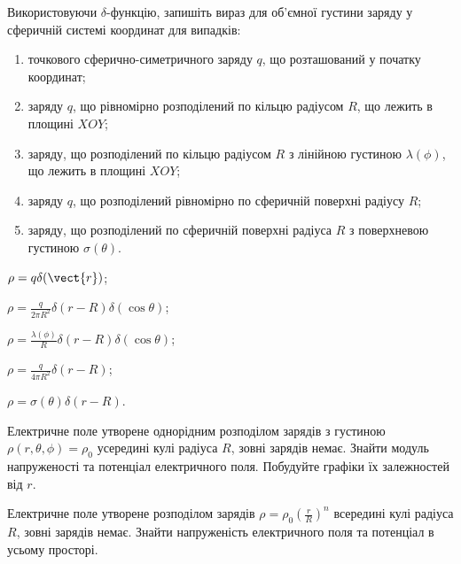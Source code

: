 \begin{problem}
Використовуючи $\delta$-функцію, запишіть вираз для об'ємної густини заряду у сферичній системі координат  для випадків:
\begin{enumerate}[label=\alph*)]
	\item точкового сферично-симетричного заряду $q$, що розташований у початку координат;
	\item заряду $q$, що рівномірно розподілений по кільцю радіусом $R$, що лежить в площині $XOY$;
	\item заряду, що розподілений по кільцю радіусом $R$ з лінійною густиною $\lambda(\phi)$, що лежить в площині $XOY$;
	\item заряду $q$, що розподілений рівномірно по сферичній  поверхні радіусу $R$;
	\item заряду, що розподілений по сферичній поверхні радіуса $R$ з поверхневою густиною $\sigma (\theta)$.
\end{enumerate}
\begin{solution}
	\begin{enumerate*}[label=\alph*)]
		\item $\rho = q\delta(\vect{r})$;
		\item $\rho = \frac{q}{2\pi R^2}\delta(r - R)\delta(\cos\theta)$;
		\item $\rho = \frac{\lambda(\phi)}{R}\delta(r - R)\delta(\cos\theta)$;
		\item $\rho = \frac{q}{4\pi R^2}\delta (r - R)$;
		\item $\rho = \sigma (\theta)\delta (r - R)$.
	\end{enumerate*}
\end{solution}
\end{problem}



\begin{problem}
Електричне поле утворене однорідним розподілом зарядів з густиною $\rho(r,\theta,\phi) = \rho_0$ усередині кулі радіуса $R$, зовні зарядів немає. Знайти модуль напруженості та потенціал електричного поля. Побудуйте графіки їх залежностей від $r$.
\end{problem}


\begin{problem}
Електричне поле утворене розподілом зарядів $\rho = \rho_0\left( \frac{r}{R}\right)^n $   всередині кулі радіуса $R$, зовні зарядів немає. Знайти напруженість електричного поля та потенціал в усьому просторі.
\end{problem}

